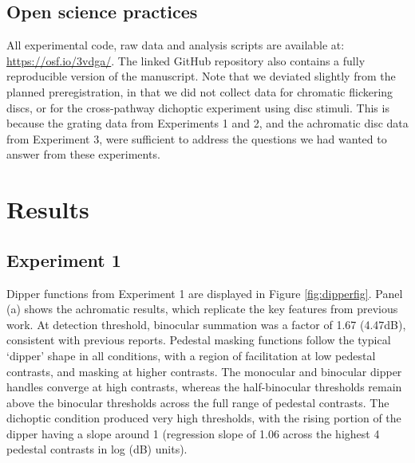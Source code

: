 \documentclass[
]{article}
\begin{document}
\hypertarget{open-science-practices}{%
\subsection{Open science practices}\label{open-science-practices}}

All experimental code, raw data and analysis scripts are available at: \url{https://osf.io/3vdga/}. The linked GitHub repository also contains a fully reproducible version of the manuscript. Note that we deviated slightly from the planned preregistration, in that we did not collect data for chromatic flickering discs, or for the cross-pathway dichoptic experiment using disc stimuli. This is because the grating data from Experiments 1 and 2, and the achromatic disc data from Experiment 3, were sufficient to address the questions we had wanted to answer from these experiments.

\hypertarget{results}{%
\section{Results}\label{results}}

\hypertarget{experiment-1}{%
\subsection{Experiment 1}\label{experiment-1}}

Dipper functions from Experiment 1 are displayed in Figure \ref{fig:dipperfig}. Panel (a) shows the achromatic results, which replicate the key features from previous work. At detection threshold, binocular summation was a factor of 1.67 (4.47dB), consistent with previous reports. Pedestal masking functions follow the typical `dipper' shape in all conditions, with a region of facilitation at low pedestal contrasts, and masking at higher contrasts. The monocular and binocular dipper handles converge at high contrasts, whereas the half-binocular thresholds remain above the binocular thresholds across the full range of pedestal contrasts. The dichoptic condition produced very high thresholds, with the rising portion of the dipper having a slope around 1 (regression slope of 1.06 across the highest 4 pedestal contrasts in log (dB) units).
\end{document}
